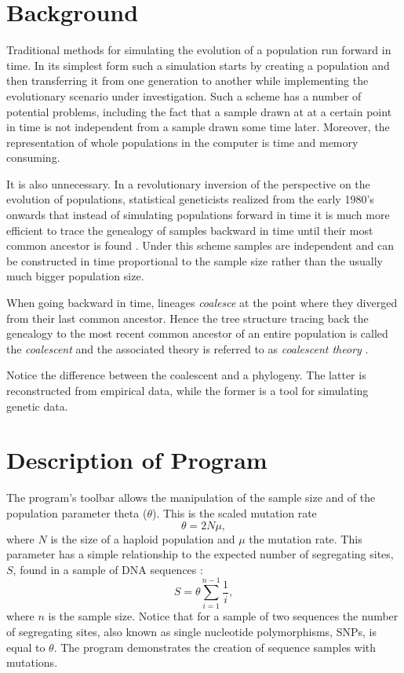 \section{Background}
Traditional methods for simulating the evolution of a population run
forward in time. In its simplest form such a simulation starts by
creating a population and then transferring it from one generation
to another while implementing the evolutionary scenario under
investigation. Such a scheme has a number of potential problems, including the fact
that a sample drawn at at a certain point in time is not independent
from a sample drawn some time later. Moreover, the representation of
whole populations in the computer is time and memory consuming. 

It is
also unnecessary. In a revolutionary inversion of the perspective on the
evolution of populations, statistical geneticists realized from the
early 1980's onwards  that instead of
simulating populations forward in 
time it is much more efficient to trace the genealogy of samples
backward in time until their most common ancestor is found \cite{kin82:coa,kin82:gen,hud90:gen}. Under this
scheme samples are independent and can be constructed in time
proportional to the sample size rather than the usually much bigger
population size.

When going backward in time, lineages \textit{coalesce} at the point
where they diverged from their last common ancestor. Hence the tree
structure tracing back the genealogy to the most recent common
ancestor of an entire population is called the \textit{coalescent} and
the associated theory is referred to as \textit{coalescent theory}
\cite{hud90:gen,nor01:coa}. 

Notice the difference between the coalescent and a phylogeny. The
latter is reconstructed from empirical data, while the former is a tool for
simulating genetic data.

\section{Description of Program}
The program's toolbar allows the manipulation of the sample size and
of the population parameter theta ($\theta$). This is the scaled
mutation rate
\[
\theta = 2N\mu,
\]
where $N$ is the size of a haploid population and $\mu$ the mutation rate. This
parameter has a simple relationship to the expected number of segregating
sites, $S$,
found in a sample of DNA sequences \cite{wat75:num}:
\begin{equation}\label{eq:s}
S = \theta\sum_{i=1}^{n-1}\frac{1}{i},
\end{equation}
where $n$ is the sample size. Notice that for a sample of two
sequences the number of segregating sites, also known as single
nucleotide polymorphisms, SNPs, is equal to $\theta$. The program
demonstrates the creation of sequence samples with mutations.

